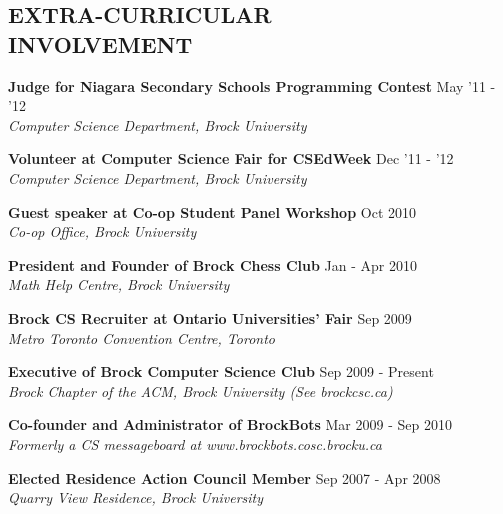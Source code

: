 \documentclass[margin]{res}
\begin{document}
\begin{resume}

\section{EXTRA-CURRICULAR \\ INVOLVEMENT}

  \textbf{Judge for Niagara Secondary Schools Programming Contest} \hfill May '11 - '12 \\
    {\sl Computer Science Department, Brock University}

  \textbf{Volunteer at Computer Science Fair for CSEdWeek} \hfill Dec '11 - '12\\
    {\sl Computer Science Department, Brock University}

  \textbf{Guest speaker at Co-op Student Panel Workshop} \hfill Oct 2010 \\
    {\sl Co-op Office, Brock University}

  \textbf{President and Founder of Brock Chess Club} \hfill Jan - Apr 2010 \\
    {\sl Math Help Centre, Brock University}

  \textbf{Brock CS Recruiter at Ontario Universities' Fair} \hfill Sep 2009 \\
    {\sl Metro Toronto Convention Centre, Toronto}

  \textbf{Executive of Brock Computer Science Club} \hfill Sep 2009 - Present \\
    {\sl Brock Chapter of the ACM, Brock University (See brockcsc.ca)}


  \textbf{Co-founder and Administrator of BrockBots} \hfill Mar 2009 - Sep 2010 \\
    {\sl Formerly a CS messageboard at www.brockbots.cosc.brocku.ca}
    

  \textbf{Elected Residence Action Council Member} \hfill Sep 2007 - Apr 2008 \\
    {\sl Quarry View Residence, Brock University}
 

\end{resume}
\end{document}
